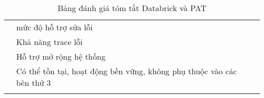 \begin{longtable}{|l|p{5cm}|ll|}
                             & mức độ hỗ trợ   sửa lỗi                        & \multicolumn{1}{l|}{}          &     \\ \cline{2-4} 
                             & Khả năng   trace lỗi                           & \multicolumn{1}{l|}{}          &     \\ \cline{2-4} 
                             & Hỗ trợ mở   rộng hệ thống                      & \multicolumn{1}{l|}{}          &     \\ \cline{2-4} 
                           & Có thể tồn   tại, hoạt động bền vững, không phụ thuộc vào các bên thứ 3 & \multicolumn{1}{l|}{}        &        \\ \hline
\caption{Bảng đánh giá tóm tắt Databrick và PAT}
\label{tab:databrick-PAT}\\
\end{longtable}